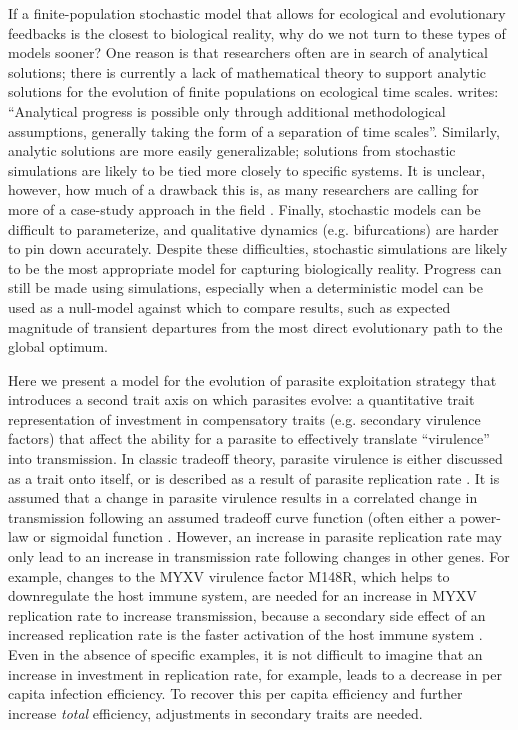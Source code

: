 If a finite-population stochastic model that allows for ecological and evolutionary feedbacks is the closest to biological reality, why do we not turn to these types of models sooner? One reason is that researchers often are in search of analytical solutions; there is currently a lack of mathematical theory to support analytic solutions for the evolution of finite populations on ecological time scales. \citet{Lion2018} writes: ``Analytical progress is possible only through additional methodological assumptions, generally taking the form of a separation of time scales''. Similarly, analytic solutions are more easily generalizable; solutions from stochastic simulations are likely to be tied more closely to specific systems. It is unclear, however, how much of a drawback this is, as many researchers are calling for more of a case-study approach in the field \citep{BullandLauring2014, AlizonandMichalakis2015, Cressleretal.2016}. Finally, stochastic models can be difficult to parameterize, and qualitative dynamics (e.g. bifurcations) are harder to pin down accurately. Despite these difficulties, stochastic simulations are likely to be the most appropriate model for capturing biologically reality. Progress can still be made using simulations, especially when a deterministic model can be used as a null-model against which to compare results, such as expected magnitude of transient departures from the most direct evolutionary path to the global optimum. 

Here we present a model for the evolution of parasite exploitation strategy that introduces a second trait axis on which parasites evolve: a quantitative trait representation of investment in compensatory traits (e.g. secondary virulence factors) that affect the ability for a parasite to effectively translate ``virulence'' into transmission. In classic tradeoff theory, parasite virulence is either discussed as a trait onto itself, or is described as a result of parasite replication rate \citep[e.g.][]{AlizonandvanBaalen2005}. It is assumed that a change in parasite virulence results in a correlated change in transmission following an assumed tradeoff curve function (often either a power-law or sigmoidal function \citealt{AlizonandvanBaalen2005, Bolkeretal.2010, Kainetal.2018}. However, an increase in parasite replication rate may only lead to an increase in transmission rate following changes in other genes. For example, changes to the MYXV virulence factor M148R, which helps to downregulate the host immune system, are needed for an increase in MYXV replication rate to increase transmission, because a secondary side effect of an increased replication rate is the faster activation of the host immune system \citealt{Blanieetal.2009}. Even in the absence of specific examples, it is not difficult to imagine that an increase in investment in replication rate, for example, leads to a decrease in per capita infection efficiency. To recover this per capita efficiency and further increase \emph{total} efficiency, adjustments in secondary traits are needed.

